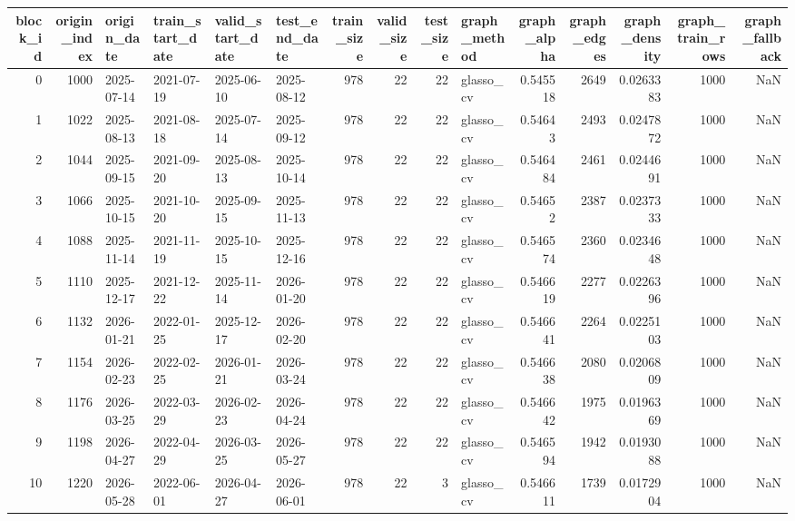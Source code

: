 \begin{tabular}{rrllllrrrlrrrrr}
\toprule
block_id & origin_index & origin_date & train_start_date & valid_start_date & test_end_date & train_size & valid_size & test_size & graph_method & graph_alpha & graph_edges & graph_density & graph_train_rows & graph_fallback \\
\midrule
0 & 1000 & 2025-07-14 & 2021-07-19 & 2025-06-10 & 2025-08-12 & 978 & 22 & 22 & glasso_cv & 0.545518 & 2649 & 0.0263383 & 1000 & NaN \\
1 & 1022 & 2025-08-13 & 2021-08-18 & 2025-07-14 & 2025-09-12 & 978 & 22 & 22 & glasso_cv & 0.54643 & 2493 & 0.0247872 & 1000 & NaN \\
2 & 1044 & 2025-09-15 & 2021-09-20 & 2025-08-13 & 2025-10-14 & 978 & 22 & 22 & glasso_cv & 0.546484 & 2461 & 0.0244691 & 1000 & NaN \\
3 & 1066 & 2025-10-15 & 2021-10-20 & 2025-09-15 & 2025-11-13 & 978 & 22 & 22 & glasso_cv & 0.54652 & 2387 & 0.0237333 & 1000 & NaN \\
4 & 1088 & 2025-11-14 & 2021-11-19 & 2025-10-15 & 2025-12-16 & 978 & 22 & 22 & glasso_cv & 0.546574 & 2360 & 0.0234648 & 1000 & NaN \\
5 & 1110 & 2025-12-17 & 2021-12-22 & 2025-11-14 & 2026-01-20 & 978 & 22 & 22 & glasso_cv & 0.546619 & 2277 & 0.0226396 & 1000 & NaN \\
6 & 1132 & 2026-01-21 & 2022-01-25 & 2025-12-17 & 2026-02-20 & 978 & 22 & 22 & glasso_cv & 0.546641 & 2264 & 0.0225103 & 1000 & NaN \\
7 & 1154 & 2026-02-23 & 2022-02-25 & 2026-01-21 & 2026-03-24 & 978 & 22 & 22 & glasso_cv & 0.546638 & 2080 & 0.0206809 & 1000 & NaN \\
8 & 1176 & 2026-03-25 & 2022-03-29 & 2026-02-23 & 2026-04-24 & 978 & 22 & 22 & glasso_cv & 0.546642 & 1975 & 0.0196369 & 1000 & NaN \\
9 & 1198 & 2026-04-27 & 2022-04-29 & 2026-03-25 & 2026-05-27 & 978 & 22 & 22 & glasso_cv & 0.546594 & 1942 & 0.0193088 & 1000 & NaN \\
10 & 1220 & 2026-05-28 & 2022-06-01 & 2026-04-27 & 2026-06-01 & 978 & 22 & 3 & glasso_cv & 0.546611 & 1739 & 0.0172904 & 1000 & NaN \\
\bottomrule
\end{tabular}
